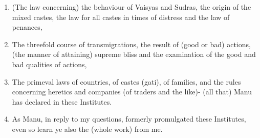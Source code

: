 \begin{enumerate}
\item (The law concerning) the behaviour of Vaisyas and Sudras, the origin of the mixed castes, the law for all castes in times of distress and the law of penances,
\item The threefold course of transmigrations, the result of (good or bad) actions, (the manner of attaining) supreme bliss and the examination of the good and bad qualities of actions,
\item The primeval laws of countries, of castes (gati), of families, and the rules concerning heretics and companies (of traders and the like)- (all that) Manu has declared in these Institutes.
\item As Manu, in reply to my questions, formerly promulgated these Institutes, even so learn ye also the (whole work) from me.
\end{enumerate}
